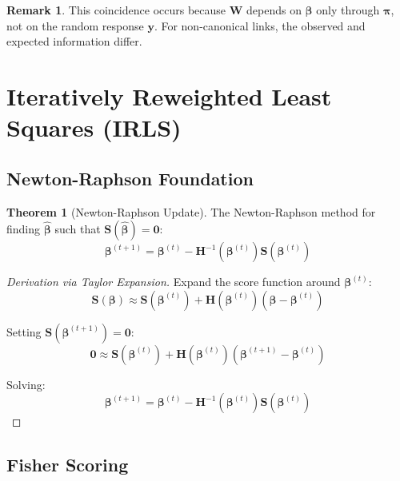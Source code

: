 \documentclass[11pt,letterpaper]{article}
\theoremstyle{definition}
\newtheorem{theorem}{Theorem}[section]
\newtheorem{remark}{Remark}[section]
\newcommand{\y}{\mathbf{y}}
\newcommand{\bb}{\boldsymbol{\beta}}
\newcommand{\pp}{\boldsymbol{\pi}}
\newcommand{\W}{\mathbf{W}}
\begin{document}
\begin{remark}
This coincidence occurs because $\W$ depends on $\bb$ only through $\pp$, not on the random response $\y$. For non-canonical links, the observed and expected information differ.
\end{remark}

\section{Iteratively Reweighted Least Squares (IRLS)}

\subsection{Newton-Raphson Foundation}

\begin{theorem}[Newton-Raphson Update]
The Newton-Raphson method for finding $\hat{\bb}$ such that $\mathbf{S}(\hat{\bb}) = \mathbf{0}$:
\begin{equation}
    \bb^{(t+1)} = \bb^{(t)} - \mathbf{H}^{-1}(\bb^{(t)}) \mathbf{S}(\bb^{(t)})
    \label{eq:newton}
\end{equation}
\end{theorem}

\begin{proof}[Derivation via Taylor Expansion]
Expand the score function around $\bb^{(t)}$:
\begin{equation}
    \mathbf{S}(\bb) \approx \mathbf{S}(\bb^{(t)}) + \mathbf{H}(\bb^{(t)})(\bb - \bb^{(t)})
\end{equation}

Setting $\mathbf{S}(\bb^{(t+1)}) = \mathbf{0}$:
\begin{equation}
    \mathbf{0} \approx \mathbf{S}(\bb^{(t)}) + \mathbf{H}(\bb^{(t)})(\bb^{(t+1)} - \bb^{(t)})
\end{equation}

Solving:
\begin{equation}
    \bb^{(t+1)} = \bb^{(t)} - \mathbf{H}^{-1}(\bb^{(t)}) \mathbf{S}(\bb^{(t)})
\end{equation}
\end{proof}

\subsection{Fisher Scoring}
\end{document}
